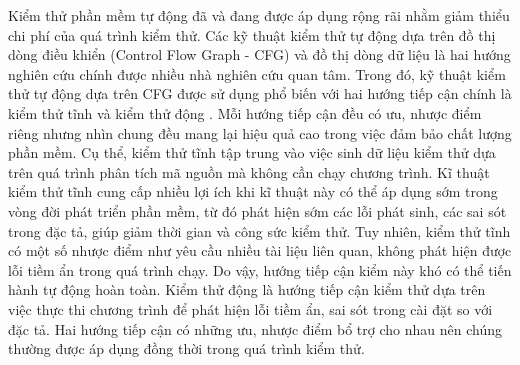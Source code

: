 Kiểm thử phần mềm tự động đã và đang được áp dụng rộng rãi nhằm giảm thiểu chi phí của quá trình kiểm thử. Các kỹ thuật kiểm thử tự động dựa trên đồ thị dòng điều khiển (Control Flow Graph - CFG) và đồ thị dòng dữ liệu là hai hướng nghiên cứu chính được nhiều nhà nghiên cứu quan tâm. Trong đó, kỹ thuật kiểm thử tự động dựa trên CFG được sử dụng phổ biến với hai hướng tiếp cận chính là kiểm thử tĩnh \cite{WARD:1989:TheStaticAnalysisofSafetyCriticalSoftwareUsingMALPAS, SecureProgrammingWithStaticAnalysis, Wichmann:1995:Industrialperspectiveonstaticanalysis, Buckle:1998:StaticAnalysisofSafetyCriticalSoftwareTechniquesToolsandExperiences} và kiểm thử động \cite{Grigorenko:1998:DynamicTesting, TUNG2022106821}. Mỗi hướng tiếp cận đều có ưu, nhược điểm riêng nhưng nhìn chung đều mang lại hiệu quả cao trong việc đảm bảo chất lượng phần mềm. Cụ thể, kiểm thử tĩnh tập trung vào việc sinh dữ liệu kiểm thử dựa trên quá trình phân tích mã nguồn mà không cần chạy chương trình. Kĩ thuật kiểm thử tĩnh cung cấp nhiều lợi ích khi kĩ thuật này có thể áp dụng sớm trong vòng đời phát triển phần mềm, từ đó phát hiện sớm các lỗi phát sinh, các sai sót trong đặc tả, giúp giảm thời gian và công sức kiểm thử. Tuy nhiên, kiểm thử tĩnh có một số nhược điểm như yêu cầu nhiều tài liệu liên quan, không phát hiện được lỗi tiềm ẩn trong quá trình chạy. Do vậy, hướng tiếp cận kiểm này khó có thể tiến hành tự động hoàn toàn. Kiểm thử động là hướng tiếp cận kiểm thử dựa trên việc thực thi chương trình để phát hiện lỗi tiềm ẩn, sai sót trong cài đặt so với đặc tả. Hai hướng tiếp cận có những ưu, nhược điểm bổ trợ cho nhau nên chúng thường được áp dụng đồng thời trong quá trình kiểm thử. 


